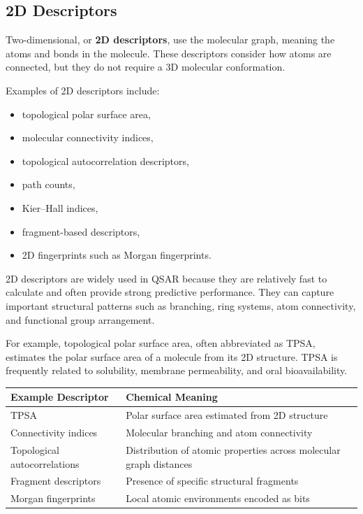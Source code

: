 \documentclass[11pt]{report}
\newenvironment{Important note}{\begin{quote}\color{red}\textbf{Important note:} }{\end{quote}}
\begin{document}
\subsection{2D Descriptors}

Two-dimensional, or \textbf{2D descriptors}, use the molecular graph, meaning the atoms and bonds in the molecule. These descriptors consider how atoms are connected, but they do not require a 3D molecular conformation.

Examples of 2D descriptors include:

\begin{itemize}[leftmargin=*]
    \item topological polar surface area,
    \item molecular connectivity indices,
    \item topological autocorrelation descriptors,
    \item path counts,
    \item Kier--Hall indices,
    \item fragment-based descriptors,
    \item 2D fingerprints such as Morgan fingerprints.
\end{itemize}

2D descriptors are widely used in QSAR because they are relatively fast to calculate and often provide strong predictive performance. They can capture important structural patterns such as branching, ring systems, atom connectivity, and functional group arrangement.

For example, topological polar surface area, often abbreviated as TPSA, estimates the polar surface area of a molecule from its 2D structure. TPSA is frequently related to solubility, membrane permeability, and oral bioavailability.

\begin{center}
\begin{tabular}{lll}
\toprule
\textbf{Example Descriptor} & \textbf{Chemical Meaning} \\
\midrule
TPSA & Polar surface area estimated from 2D structure \\
Connectivity indices & Molecular branching and atom connectivity \\
Topological autocorrelations & Distribution of atomic properties across molecular graph distances \\
Fragment descriptors & Presence of specific structural fragments \\
Morgan fingerprints & Local atomic environments encoded as bits \\
\bottomrule
\end{tabular}
\end{center}
\end{document}
